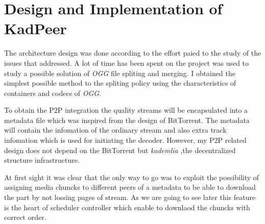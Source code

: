 \chapter{Design and Implementation of KadPeer}
\label{chap3}
{
The architecture design was done according to the effort paied to the study of the issues that addressed.
A lot of time has been spent on the project was used to study a possible solution of \emph{OGG} file spliting and merging.
I obtained the simplest possible method to the spliting policy using the characteristics of containers and codecs of \emph{OGG}.

To obtain the P2P integration the quality streams will be encapsulated into a metadata file which was inspired from the design of BitTorrent.
The metadata will contain the infomation of the ordinary stream and also extra track infomation which is used for initiating the decoder.
However, my P2P related design does not depend on the BitTorrent but \emph{kademlia} ,the decentralized structure infrastructure.

At first sight it was clear that the only way to go was to exploit the possibility of assigning media chuncks to different peers of a metadata to be able to download the part by not lossing pages of stream. As we are going to see later this feature is the heart of scheduler controller which enable to downlaod the chuncks with correct order.
}

